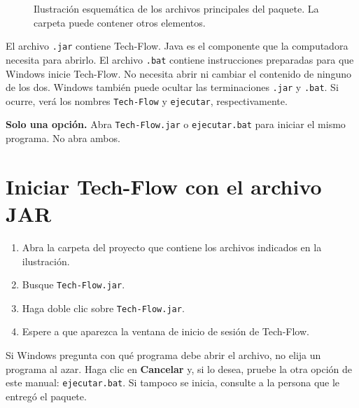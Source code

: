 \documentclass[12pt,a4paper]{article}
\begin{document}
\begin{figure}[H]\centering
{}
\caption{Ilustración esquemática de los archivos principales del paquete. La carpeta puede contener otros elementos.}\label{fig:instalacion-archivos}
\end{figure}

El archivo \texttt{.jar} contiene Tech-Flow. Java es el componente que la computadora necesita para abrirlo. El archivo \texttt{.bat} contiene instrucciones preparadas para que Windows inicie Tech-Flow. No necesita abrir ni cambiar el contenido de ninguno de los dos.
Windows también puede ocultar las terminaciones \texttt{.jar} y \texttt{.bat}. Si ocurre, verá los nombres \texttt{Tech-Flow} y \texttt{ejecutar}, respectivamente.

\begin{techbox}\textbf{Solo una opción.} Abra \texttt{Tech-Flow.jar} o \texttt{ejecutar.bat} para iniciar el mismo programa. No abra ambos.\end{techbox}

\section{Iniciar Tech-Flow con el archivo JAR}
\begin{enumerate}
\item Abra la carpeta del proyecto que contiene los archivos indicados en la ilustración.
\item Busque \texttt{Tech-Flow.jar}.
\item Haga doble clic sobre \texttt{Tech-Flow.jar}.
\item Espere a que aparezca la ventana de inicio de sesión de Tech-Flow.
\end{enumerate}
Si Windows pregunta con qué programa debe abrir el archivo, no elija un programa al azar. Haga clic en \textbf{Cancelar} y, si lo desea, pruebe la otra opción de este manual: \texttt{ejecutar.bat}. Si tampoco se inicia, consulte a la persona que le entregó el paquete.
\end{document}
